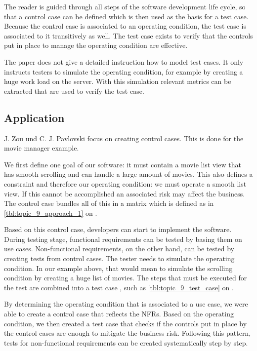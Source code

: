 The reader is guided through all steps of the software development life cycle, so that a control case can be defined which is then used as the basis for a test case. Because the control case is associated to an operating condition, the test case is associated to it transitively as well.
The test case exists to verify that the controls put in place to manage the operating condition are effective.

The paper does not give a detailed instruction how to model test cases. It only instructs testers to simulate the operating condition, for example by creating a huge work load on the server.
With this simulation relevant metrics can be extracted that are used to verify the test case.



\subsection{Application}

J. Zou und C. J. Pavlovski focus on creating control cases. This is done for the movie manager example.

We first define one goal of our software:
it must contain a movie list view that has smooth scrolling and can handle a large amount of movies.
This also defines a constraint and therefore our operating condition: we must operate a smooth list view.
If this cannot be accomplished an associated risk may affect the business. The control case bundles all of this in a matrix which is defined as in \autoref{tbl:topic_9_approach_1} on .

Based on this control case, developers can start to implement the software. During
testing stage, functional requirements can be tested by basing them on use cases. Non-functional requirements, on the other hand, can be tested by creating tests from control cases.
The tester needs to simulate the operating condition.
In our example above, that would mean to simulate the scrolling condition by creating a huge list of movies.
The steps that must be executed for the test are combined into a test case , such as \autoref{tbl:topic_9_test_case} on .

By determining the operating condition that is associated to a use case, we were able to create a control case that reflects the NFRs.
Based on the operating condition, we then created a test case that checks if the controls put in place by the control cases are enough to mitigate the business risk.
Following this pattern, tests for non-functional requirements can be created systematically step by step.

